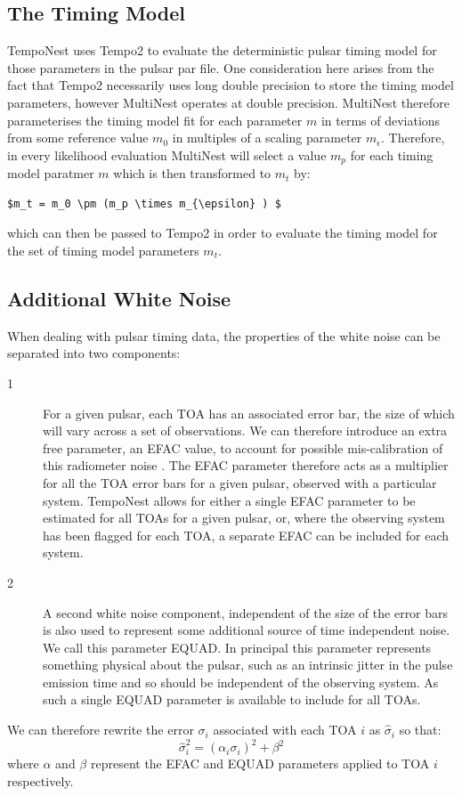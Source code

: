 \documentclass[%
 preprint,
 amsmath,amssymb,amsfonts,
 aps,
]{revtex4-1}
\begin{document}
\subsection{The Timing Model}
\label{section:timingmodel}
TempoNest uses Tempo2  to evaluate the deterministic pulsar timing model for those parameters in the pulsar par file.
One consideration here arises from the fact that Tempo2 necessarily uses long double precision to store the timing model parameters, however MultiNest operates at double precision.  MultiNest therefore parameterises the timing model fit for each parameter $m$ in terms of deviations from some reference value $m_0$ in multiples of a scaling parameter $m_{\epsilon}$.   Therefore, in every likelihood evaluation MultiNest will select a value $m_p$ for each timing model paratmer $m$ which is then transformed to $m_t$ by:
%
\begin{lstlisting}[mathescape]
$m_t = m_0 \pm (m_p \times m_{\epsilon} ) $
\end{lstlisting}
%
which can then be passed to Tempo2 in order to evaluate the timing model for the set of timing model parameters $m_t$.


\subsection{Additional White Noise}
\label{Section:White}


When dealing with pulsar timing data, the properties of the white noise can be separated into two components:

\begin{description}
  \item[1] For a given pulsar, each TOA has an associated error bar, the size of which will vary across a set of observations.  We can therefore introduce an extra free parameter, an EFAC value, to account for possible mis-calibration of this radiometer noise \cite{2006MNRAS.369..655H}.  The EFAC parameter therefore acts as a multiplier for all the TOA error bars for a given pulsar, observed with a particular system. TempoNest allows for either a single EFAC parameter to be estimated for all TOAs for a given pulsar, or, where the observing system has been flagged for each TOA, a separate EFAC can be included for each system.\\
 \item[2] A second white noise component, independent of the size of the error bars is also used to represent some additional source of time independent noise.  We call this parameter EQUAD.  In principal this parameter represents something physical about the pulsar, such as an intrinsic jitter in the pulse emission time and so should be independent of the observing system.  As such a single EQUAD parameter is available to include for all TOAs.
\end{description} 
%
We can therefore rewrite the error $\sigma_i$ associated with each TOA $i$ as $\hat{\sigma}_i$ so that:
\begin{equation}
\hat{\sigma}_i^2 = (\alpha_i\sigma_i)^2 + \beta^2
\end{equation}
%
where $\alpha$ and $\beta$ represent the EFAC and EQUAD parameters applied to TOA $i$ respectively.  
\end{document}
